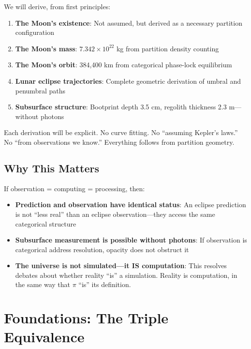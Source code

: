 \documentclass[12pt,a4paper]{article}
\theoremstyle{definition}
\theoremstyle{remark}
\begin{document}
We will derive, from first principles:

\begin{enumerate}
    \item \textbf{The Moon's existence}: Not assumed, but derived as a necessary partition configuration
    \item \textbf{The Moon's mass}: $7.342 \times 10^{22}$ kg from partition density counting
    \item \textbf{The Moon's orbit}: 384,400 km from categorical phase-lock equilibrium
    \item \textbf{Lunar eclipse trajectories}: Complete geometric derivation of umbral and penumbral paths
    \item \textbf{Subsurface structure}: Bootprint depth 3.5 cm, regolith thickness 2.3 m---without photons
\end{enumerate}

Each derivation will be explicit. No curve fitting. No ``assuming Kepler's laws.'' No ``from observations we know.'' Everything follows from partition geometry.

\subsection{Why This Matters}

If observation = computing = processing, then:

\begin{itemize}
    \item \textbf{Prediction and observation have identical status}: An eclipse prediction is not ``less real'' than an eclipse observation---they access the same categorical structure
    \item \textbf{Subsurface measurement is possible without photons}: If observation is categorical address resolution, opacity does not obstruct it
    \item \textbf{The universe is not simulated---it IS computation}: This resolves debates about whether reality ``is'' a simulation. Reality is computation, in the same way that $\pi$ ``is'' its definition.
\end{itemize}

\section{Foundations: The Triple Equivalence}
\label{sec:foundations}
\end{document}
